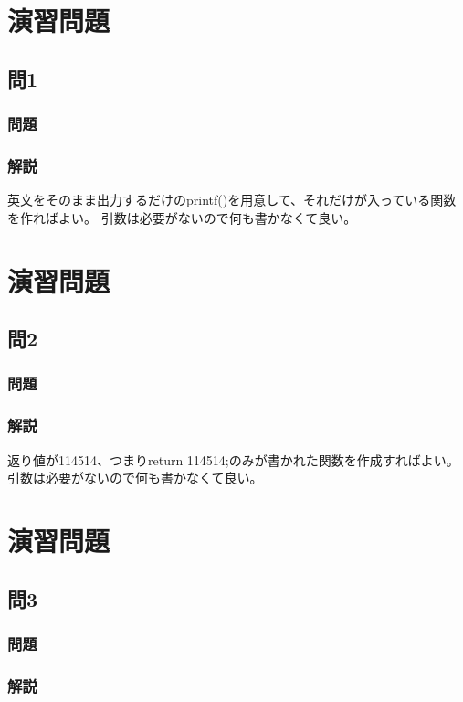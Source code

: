 \section{演習問題}
\subsection{問1}
\subsubsection{問題}

\subsubsection{解説}

英文をそのまま出力するだけのprintf()を用意して、それだけが入っている関数を作ればよい。
引数は必要がないので何も書かなくて良い。

\section{演習問題}
\subsection{問2}
\subsubsection{問題}

\subsubsection{解説}

返り値が114514、つまりreturn 114514;のみが書かれた関数を作成すればよい。
引数は必要がないので何も書かなくて良い。

\section{演習問題}
\subsection{問3}
\subsubsection{問題}

\subsubsection{解説}

